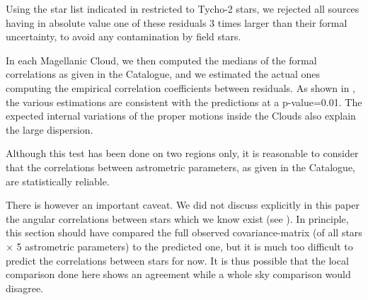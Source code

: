 Using the star list indicated in  restricted to Tycho-2 stars, we rejected 
all sources having in absolute value one of these residuals 3 times larger than their formal
uncertainty, to avoid any contamination by field stars.  

In each Magellanic Cloud, we then computed the medians of the formal correlations 
as given in the Catalogue, and we estimated the actual ones computing the
empirical correlation coefficients between residuals. As shown in ,
the various estimations are consistent with the predictions at a p-value=0.01.
The expected internal variations of the proper motions inside the Clouds also explain
the large dispersion.

Although this test has been done on two regions only, it is reasonable to consider 
that the correlations between astrometric parameters, as given in the Catalogue, 
are statistically reliable.

There is however an important caveat. We did not discuss explicitly in this paper the 
angular correlations between stars which we know exist (see ).
In principle, this section should have compared the full observed covariance-matrix
(of all stars $\times$ 5 astrometric parameters) to the predicted one, but it is much too
difficult to predict the correlations between stars for now. It is thus possible that
the local comparison done here shows an agreement while a whole sky comparison would 
disagree. 



